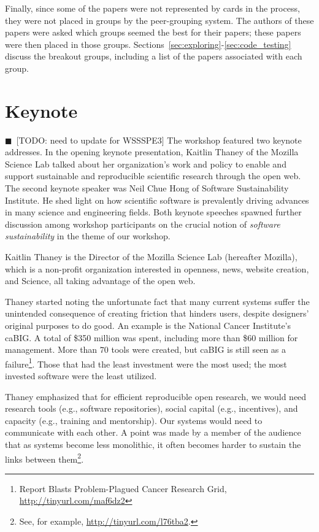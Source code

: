 \documentclass[11pt, oneside]{amsart}
\newcommand{\todo}[1]{{\color{blue}$\blacksquare$~\textsf{[TODO: #1]}}}
\begin{document}
Finally, since some of the papers were not represented by cards in the process,
they were not placed in groups by the peer-grouping system. The authors of
these papers were asked which groups seemed the best for their papers; these
papers were then placed in those groups. Sections~\ref{sec:exploring}-\ref{sec:code_testing}
discuss the breakout groups, including a list of the papers associated with each
group.


\section{Keynote} \label{sec:keynote}
\todo{need to update for WSSSPE3}
The workshop featured two keynote addresses. In the opening keynote
presentation, Kaitlin Thaney of the Mozilla Science Lab talked about her
organization's work and policy to enable and support sustainable and
reproducible scientific research through the open web. The second keynote
speaker was Neil Chue Hong of Software Sustainability Institute. He shed
light on how scientific software is prevalently driving advances in many science
and engineering fields. Both keynote speeches spawned further discussion among
workshop participants on the crucial notion of \emph{software sustainability}
in the theme of our workshop.


Kaitlin Thaney is the Director of the Mozilla Science Lab (hereafter Mozilla), which
is a non-profit organization interested in openness, news, website
creation, and Science, all taking advantage of the open web.

Thaney started noting the unfortunate fact that many current systems suffer the
unintended consequence of creating friction that hinders users, despite
designers' original purposes to do good. An example is the National Cancer
Institute's caBIG. A total of \$350 million was spent, including more than \$60
million for management. More than $70$ tools were created, but caBIG is still
seen as a failure\footnote{Report Blasts Problem-Plagued Cancer Research Grid,
\url{http://tinyurl.com/maf6dz2}}. Those that had the least investment were the
most used; the most invested software were the least utilized.

Thaney emphasized that for efficient reproducible open research, we would need
research tools (e.g., software repositories), social capital (e.g., incentives),
and capacity (e.g., training and mentorship). Our systems would need to
communicate with each other. A point was made by a member of the audience that
as systems become less monolithic, it often becomes harder to sustain the links
between them\footnote{See, for example, \url{http://tinyurl.com/l76tba2}.}.
\end{document}
